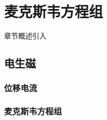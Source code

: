 \chapter{麦克斯韦方程组}\label{20}

章节概述引入

\section{电生磁}\label{20-1}

\subsection{位移电流}\label{20-1-1}

\subsection{麦克斯韦方程组}\label{20-1-2}

